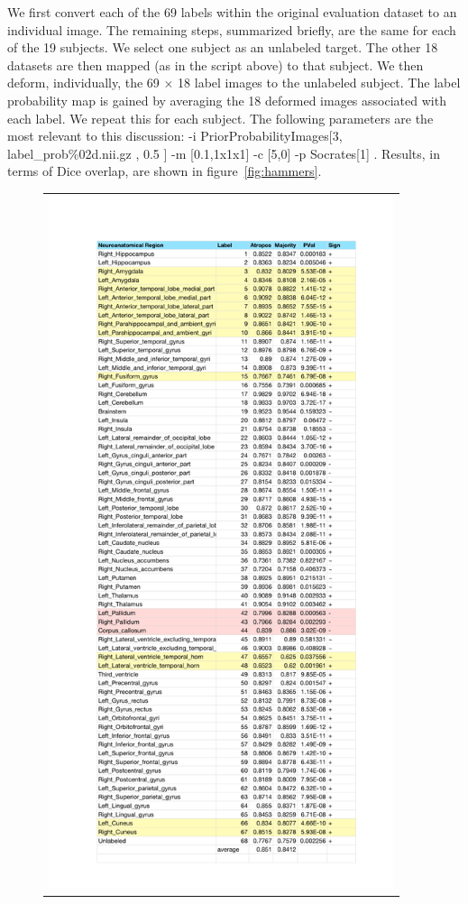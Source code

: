 \documentclass[11pt,english]{article}
\begin{document}
We first convert each of the 69 labels within the original evaluation
dataset to an individual image.  The remaining steps,
summarized briefly, are the same for each of the 19 subjects.  We
select one subject as an unlabeled target.  The other 18 datasets are
then mapped (as in the script above) to that subject.  We then deform,
individually, the 69 $\times$ 18 label images to the unlabeled
subject.  The label probability map is gained by averaging the 18
deformed images associated with each label.  We repeat this for each
subject.  The following parameters are the most relevant to this discussion:
{\ttfamily  -i  PriorProbabilityImages[3, label\_prob\%02d.nii.gz , 0.5
  ] -m [0.1,1x1x1] -c [5,0] -p Socrates[1] }.  Results, in terms of
Dice overlap, are shown in figure~\ref{fig:hammers}.
\begin{figure}
\begin{center}
\begin{tabular}{c}
\includegraphics[height=8in]{Figures/final_results_majority_vote_vs_atropos.pdf}

\end{tabular}
\end{center}
\end{figure}
\end{document}
